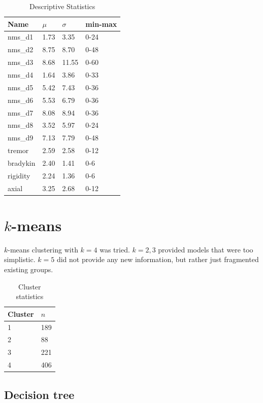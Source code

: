 \documentclass[letterpaper,12pt]{article}
\begin{document}
\begin{table}[h]
  \centering
  \begin{tabular}{l|l|l|l}
  Name  &       $\mu$ & $\sigma$ & min-max \\
         \hline
nms\_d1&   1.73&  3.35&   0-24 \\
nms\_d2&   8.75&  8.70&   0-48 \\
nms\_d3&   8.68& 11.55&   0-60 \\
nms\_d4&   1.64&  3.86&   0-33 \\
nms\_d5&   5.42&  7.43&   0-36 \\
nms\_d6&   5.53&  6.79&   0-36 \\
nms\_d7&   8.08&  8.94&   0-36 \\
nms\_d8&   3.52&  5.97&   0-24 \\
nms\_d9&   7.13&  7.79&   0-48 \\
tremor&   2.59&  2.58&   0-12 \\
bradykin& 2.40&  1.41&   0-6 \\
rigidity& 2.24&  1.36&   0-6 \\
axial&    3.25&  2.68&   0-12 \\
  \end{tabular}
  \caption{Descriptive Statistics}
  \label{tab:descriptive-statistics}
\end{table}

\section{$k$-means}

$k$-means clustering with $k = 4$ was tried. $k = 2, 3$ provided models that
were too simplistic. $k = 5$ did not provide any new information, but rather
just fragmented existing groups.

\begin{table}[h]
  \centering
  \caption{Cluster statistics}
  \label{tab:cluster_stats}
  \begin{tabular}{l|l}
    Cluster & $n$ \\
    \hline
    1 & 189 \\
    2 & 88 \\
    3 & 221 \\
    4 & 406 \\
  \end{tabular}
\end{table}


\subsection{Decision tree}
\end{document}
